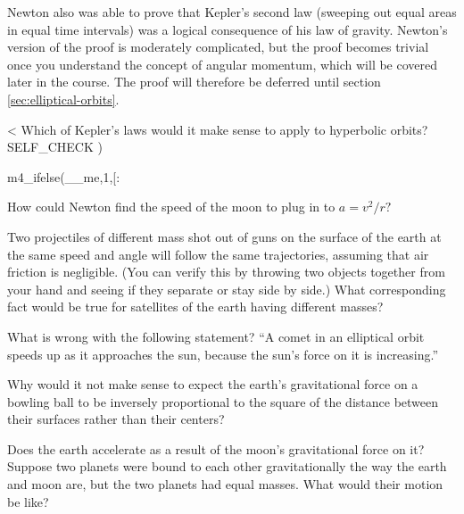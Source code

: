 Newton also was able to prove that Kepler's second law
(sweeping out equal areas in equal time intervals) was a
logical consequence of his law of gravity.  Newton's version
of the proof is moderately complicated, but the proof
becomes trivial once you understand the concept of angular
momentum, which will be covered later in the course. The
proof will therefore be deferred until section \ref{sec:elliptical-orbits}.

<%
Which of Kepler's laws would it make sense to apply
to hyperbolic orbits?
  SELF_CHECK
  ) %

m4_ifelse(__me,1,[:%

\startdqs

\begin{dq}
How could Newton find the speed of the moon to plug in to $a=v^2/r?$
\end{dq}

\begin{dq}
Two projectiles of different mass shot out of guns on the
surface of the earth at the same speed and angle will follow
the same trajectories, assuming that air friction is
negligible.  (You can verify this by throwing two objects
together from your hand and seeing if they separate or stay
side by side.)  What corresponding fact would be true for
satellites of the earth having different masses?
\end{dq}

\begin{dq}
What is wrong with the following statement?  ``A comet in
an elliptical orbit speeds up as it approaches the sun,
because the sun's force on it is increasing.''
\end{dq}

\begin{dq}
Why would it not make sense to expect the earth's
gravitational force on a bowling ball to be inversely
proportional to the square of the distance between their
surfaces rather than their centers?
\end{dq}

\begin{dq}
Does the earth accelerate as a result of the moon's
gravitational force on it?  Suppose two planets were bound
to each other gravitationally the way the earth and moon
are, but the two planets had equal masses.  What would
their motion be like?
\end{dq}

